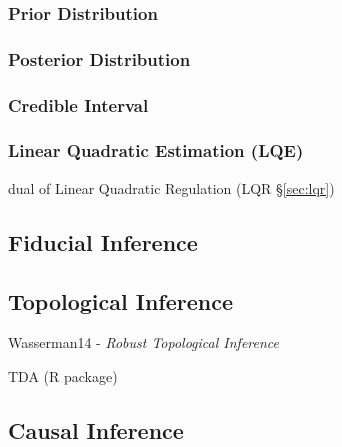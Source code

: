 \subsubsection{Prior Distribution}\label{sec:prior_distribution}

\subsubsection{Posterior Distribution}\label{sec:posterior_distribution}

\subsubsection{Credible Interval}\label{sec:credible_interval}

\subsubsection{Linear Quadratic Estimation (LQE)}\label{sec:lqe}

dual of Linear Quadratic Regulation (LQR \S\ref{sec:lqr})



\subsection{Fiducial Inference}\label{sec:fiducial_inference}

\subsection{Topological Inference}\label{sec:topological_inference}

Wasserman14 - \emph{Robust Topological Inference}

TDA (R package)



\subsection{Causal Inference}\label{sec:causal_inference}

